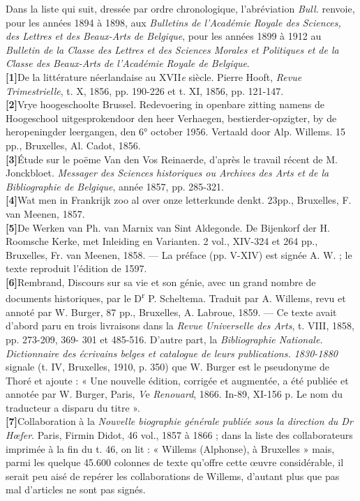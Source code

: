 \documentclass{book}%
\newcommand{\italique}[1]{\textit{#1}}%
\newcommand{\nieme}[1]{#1\italique{e}}%
\newcommand{\expo}[1]{\textsuperscript{#1}}%
\newcommand{\biblio}[2]{\hspace*{-1.5cm}\textbf{[#1]}\hspace*{1.5cm}#2\\

}
\begin{document}
Dans la liste qui suit, dressée par ordre chronologique, l'abréviation \italique{Bull.} renvoie, pour les années 1894 à 1898, aux \italique{Bulletins de l'Académie Royale des Sciences, des Lettres et des Beaux-Arts de Belgique}, pour les années 1899 à 1912 au \italique{Bulletin de la Classe des Lettres et des Sciences Morales et Politiques et de la Classe des Beaux-Arts de l'Académie Royale de Belgique}.\\


\biblio{1}{De la littérature néerlandaise au \nieme{XVII} siècle. Pierre Hooft, \italique{Revue Trimestrielle}, t. X, 1856, pp. 190-226 et t. XI, 1856, pp. 121-147.}%
\biblio{2}{Vrye hoogeschoolte Brussel. Redevoering in openbare zitting namens de Hoogeschool uitgesprokendoor den heer Verhaegen, bestierder-opzigter, by de heropeningder leergangen, den 6° october 1956. Vertaald door Alp. Willems. 15 pp., Bruxelles, Al. Cadot, 1856.}%
\biblio{3}{Étude sur le poëme Van den Vos Reinaerde, d'après le travail récent de M. Jonckbloet. \italique{Messager des Sciences historiques ou Archives des Arts et de la Bibliographie de Belgique}, année 1857, pp. 285-321.}%
\biblio{4}{Wat men in Frankrijk zoo al over onze letterkunde denkt. 23pp., Bruxelles, F. van Meenen, 1857.}%
\biblio{5}{De Werken van Ph. van Marnix van Sint Aldegonde. De Bijenkorf der H. Roomsche Kerke, met Inleiding en Varianten. 2 vol., XIV-324 et 264 pp., Bruxelles, Fr. van Meenen, 1858. — La préface (pp. V-XIV) est signée A. W. ; le texte reproduit l'édition de 1597.}%
\biblio{6}{Rembrand, Discours sur sa vie et son génie, avec un grand nombre de documents historiques, par le D\expo{r} P. Scheltema. Traduit par A. Willems, revu et annoté par W. Burger, 87 pp., Bruxelles, A. Labroue, 1859. — Ce texte avait d'abord paru en trois livraisons dans la \italique{Revue Universelle des Arts}, t. VIII, 1858, pp. 273-209, 369- 301 et 485-516. D'autre part, la \italique{Bibliographie Nationale. Dictionnaire des écrivains belges et catalogue de leurs publications. 1830-1880} signale (t. IV, Bruxelles, 1910, p. 350) que W. Burger est le pseudonyme de Thoré et ajoute : « Une nouvelle édition, corrigée et augmentée, a été publiée et annotée par W. Burger, Paris, \italique{V}e\italique{ Renouard}, 1866. In-89, XI-156 p. Le nom du traducteur a disparu du titre ».}%
\biblio{7}{Collaboration à la \italique{Nouvelle biographie générale publiée sous la direction du Dr Hœfer}. Paris, Firmin Didot, 46 vol., 1857 à 1866 ; dans la liste des collaborateurs imprimée à la fin du t. 46, on lit : « Willems (Alphonse), à Bruxelles » mais, parmi les quelque 45.600 colonnes de texte qu'offre cette œuvre considérable, il serait peu aisé de repérer les collaborations de Willems, d'autant plus que pas mal d'articles ne sont pas signés.}%
\end{document}
